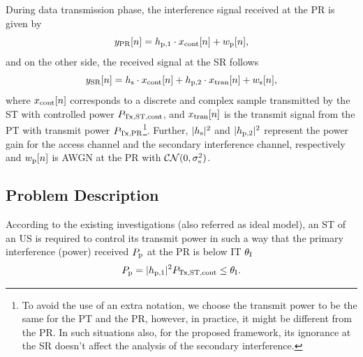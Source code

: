 During data transmission phase, the interference signal received at the PR is given by
\begin{equation}
y_{\text{PR}}[n] = h_{\text{p,1}}  \cdot x_{\text{cont}}[n] + w_{\text{p}}[n],
\label{eq:sys_mod_pr}
\end{equation}
and on the other side, the received signal at the SR follows 
\begin{equation}
y_{\text{SR}}[n] = h_{\text{s}} \cdot x_{\text{cont}}[n] + h_{\text{p,2}} \cdot x_{\text{tran}}[n] + w_{\text{s}}[n],
\label{eq:sys_mod_sr}
\end{equation}
where $x_{\text{cont}}[n]$ corresponds to a discrete and complex sample transmitted by the ST with controlled power $P_{\text{Tx,ST,cont}}$, and $x_{\text{tran}}[n]$ is the transmit signal from the PT with transmit power $P_{\text{Tx,PR}}$\footnote{To avoid the use of an extra notation, we choose the transmit power to be the same for the PT and the PR, however, in practice, it might be different from the PR. In such situations also, for the proposed framework, its ignorance at the SR doesn't affect the analysis of the secondary interference.}. Further, $|h_{\text{s}}|^2$ and $|h_{\text{p,2}}|^2$ represent the power gain for the access channel and the secondary interference channel, respectively and $w_{\text{p}}[n]$ is AWGN at the PR with $\mathcal{CN}(0, \sigma^2_{\text{s}})$. %


\subsection{Problem Description} \label{ssec:pd}
According to the existing investigations (also referred as ideal model), an ST of an US is required to control its transmit power in such a way that the primary interference (power) received $P_{\text{p}}$ at the PR is below IT $\theta_{\text{I}}$ \cite{Xing07}
\begin{equation}
P_{\text{p}} = |h_{\text{p,1}}|^2 P_{\text{Tx,ST,cont}} \le \theta_{\text{I}}.
\label{eq:IT_id}
\end{equation}


